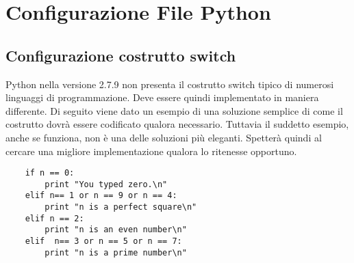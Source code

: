 %



\section{Configurazione File Python} %
\label{sec:configurazione_file_python}

	\subsection{Configurazione costrutto switch} %
	\label{sub:configurazione_costrutto_switch}
	Python nella versione 2.7.9 non presenta il costrutto switch tipico di numerosi linguaggi di programmazione. Deve essere quindi implementato in maniera differente. Di seguito viene dato un esempio di una soluzione semplice di come il costrutto dovrà essere codificato qualora necessario. Tuttavia il suddetto esempio, anche se funziona, non è una delle soluzioni più eleganti. Spetterà quindi al \roleAdministrator{} cercare una migliore implementazione qualora lo ritenesse opportuno.
	\begin{verbatim}
	if n == 0:
	    print "You typed zero.\n"
	elif n== 1 or n == 9 or n == 4:
	    print "n is a perfect square\n"
	elif n == 2:
	    print "n is an even number\n"
	elif  n== 3 or n == 5 or n == 7:
	    print "n is a prime number\n"
	\end{verbatim}

